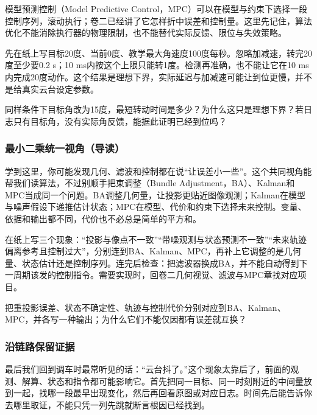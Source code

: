 模型预测控制（Model Predictive Control，MPC）可以在模型与约束下选择一段控制序列，滚动执行；卷二已经讲了它怎样折中误差和控制量。这里先记住，算法优化不能消除执行器的物理限制，也不能替代实际反馈、限位与失效策略。

\begin{example}[检查限幅造成的滞后]
先在纸上写目标20度、当前0度、教学最大角速度100度每秒。忽略加减速，转完20度至少要0.2 s；10 ms内按这个上限只能转1度。检测再准确，也不能让它在10 ms内完成20度动作。这个结果是理想下界，实际延迟与加减速可能让到位更慢，并不是给真实云台设定参数。
\end{example}

\begin{exercise}
\label{v3-ex-aim-4}
同样条件下目标角改为15度，最短转动时间是多少？为什么这只是理想下界？若日志只有目标角，没有实际角反馈，能据此证明已经到位吗？
\end{exercise}

\subsubsection{最小二乘统一视角（导读）}

学到这里，你可能发现几何、滤波和控制都在说“让误差小一些”。这个共同视角能帮我们读算法，不过别顺手把束调整（Bundle Adjustment，BA）、Kalman和MPC当成同一个问题。BA调整几何量，让投影更贴近图像观测；Kalman在模型与噪声假设下递推估计状态；MPC在模型、代价和约束下选择未来控制。变量、依据和输出都不同，代价也不必总是简单的平方和。

\begin{example}[按误差对象认算法]
在纸上写三个现象：“投影与像点不一致”“带噪观测与状态预测不一致”“未来轨迹偏离参考且控制过大”，分别连到BA、Kalman、MPC，再补上它调整的是几何量、状态估计还是控制序列。连完后检查：把滤波器换成BA，并不能自动得到下一周期该发的控制指令。需要实现时，回卷二几何视觉、滤波与MPC章找对应项目。
\end{example}

\begin{exercise}
\label{v3-ex-aim-5}
把重投影误差、状态不确定性、轨迹与控制代价分别对应到BA、Kalman、MPC，并各写一种输出；为什么它们不能仅因都有误差就互换？
\end{exercise}

\subsubsection{沿链路保留证据}

最后我们回到调车时最常听见的话：“云台抖了。”这个现象太靠后了，前面的观测、解算、状态和指令都可能影响它。首先把同一目标、同一时刻附近的中间量放到一起，找哪一段最早出现变化，然后再回看原图或对应日志。时间先后能告诉你去哪里取证，不能只凭一列先跳就断言根因已经找到。

